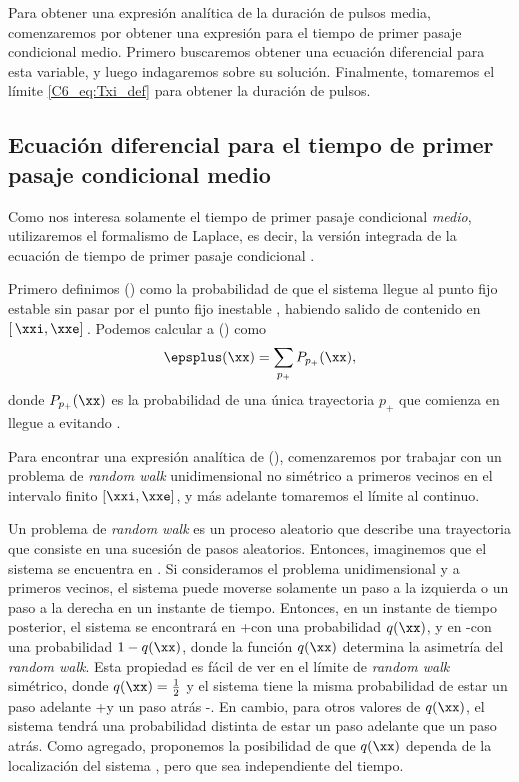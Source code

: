 {Para obtener una expresión analítica de la duración de pulsos media, comenzaremos por obtener una expresión para el tiempo de primer pasaje condicional medio. Primero buscaremos obtener una ecuación diferencial para esta variable, y luego indagaremos sobre su solución. Finalmente, tomaremos el límite \ref{C6_eq:Txi_def} para obtener la duración de pulsos.

\subsection{Ecuación diferencial para el tiempo de primer pasaje condicional medio}

Como nos interesa solamente el tiempo de primer pasaje condicional \emph{medio}, utilizaremos el formalismo de Laplace, es decir, la versión integrada de la ecuación de tiempo de primer pasaje condicional \cite{Redner2001}.

Primero definimos \epsplus(\xx) como la probabilidad de que el sistema llegue al punto fijo estable \xxe sin pasar por el punto fijo inestable \xxi, habiendo salido de \xx contenido en $[ \,\xxi,\xxe ]\,$. Podemos calcular a \epsplus(\xx) como
\begin{equation}
    \epsplus(\xx) = \sum_{p_{+}} P_{p_{+}}(\xx),
    \label{C6_eq:mFPT_eps_def}
\end{equation}
donde $P_{p_{+}}(\xx)$ es la probabilidad de una única trayectoria $p_{+}$ que comienza en \xx llegue a \xxe evitando \xxi. 

Para encontrar una expresión analítica de \epsplus(\xx), comenzaremos por trabajar con un problema de \textit{random walk} unidimensional no simétrico a primeros vecinos en el intervalo finito $[\xxi,\xxe ]$, y más adelante tomaremos el límite al continuo. 


Un problema de \textit{random walk} es un proceso aleatorio que describe una trayectoria que consiste en una sucesión de pasos aleatorios. Entonces, imaginemos que el sistema se encuentra en \xx. Si consideramos el problema unidimensional y a primeros vecinos, el sistema puede moverse solamente un paso a la izquierda o un paso a la derecha en un instante de tiempo. Entonces, en un instante de tiempo posterior, el sistema se encontrará en \xx+\deltax con una probabilidad $q(\xx)$, y en \xx-\deltax con una probabilidad $1-q(\xx)$, donde la función $q(\xx)$ determina la asimetría del \textit{random walk}. Esta propiedad es fácil de ver en el límite de \textit{random walk} simétrico, donde $q(\xx) = \frac{1}{2}$ y el sistema tiene la misma probabilidad de estar un paso adelante \xx+\deltax y un paso atrás \xx-\deltax. En cambio, para otros valores de $q(\xx)$, el sistema tendrá una probabilidad distinta de estar un paso adelante que un paso atrás. Como agregado, proponemos la posibilidad de que $q(\xx)$ dependa de la localización del sistema \xx, pero que sea independiente del tiempo. 

}
